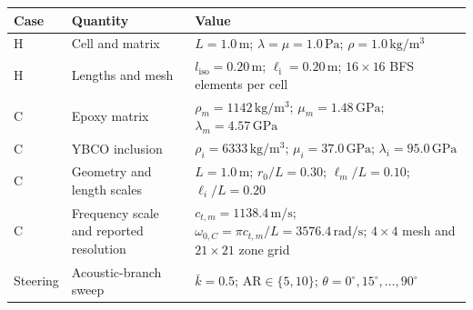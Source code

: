\begin{tabular}{@{}l p{2.9cm} p{10.8cm}@{}}
\toprule
Case & Quantity & Value \\
\midrule
H & Cell and matrix & $L=1.0\,\mathrm{m}$; $\lambda=\mu=1.0\,\mathrm{Pa}$; $\rho=1.0\,\mathrm{kg/m^3}$ \\
H & Lengths and mesh & $l_{\mathrm{iso}}=0.20\,\mathrm{m}$; $\ell_{\mathrm{i}}=0.20\,\mathrm{m}$; $16\times16$ BFS elements per cell \\
C & Epoxy matrix & $\rho_m=1142\,\mathrm{kg/m^3}$; $\mu_m=1.48\,\mathrm{GPa}$; $\lambda_m=4.57\,\mathrm{GPa}$ \\
C & YBCO inclusion & $\rho_i=6333\,\mathrm{kg/m^3}$; $\mu_i=37.0\,\mathrm{GPa}$; $\lambda_i=95.0\,\mathrm{GPa}$ \\
C & Geometry and length scales & $L=1.0\,\mathrm{m}$; $r_0/L=0.30$; $\ell_m/L=0.10$; $\ell_i/L=0.20$ \\
C & Frequency scale and reported resolution & $c_{t,m}=1138.4\,\mathrm{m/s}$; $\omega_{0,C}=\pi c_{t,m}/L=3576.4\,\mathrm{rad/s}$; $4\times4$ mesh and $21\times21$ zone grid \\
Steering & Acoustic-branch sweep & $\bar{k}=0.5$; $\mathrm{AR}\in\{5,10\}$; $\theta=0^\circ,15^\circ,\ldots,90^\circ$ \\
\bottomrule
\end{tabular}
